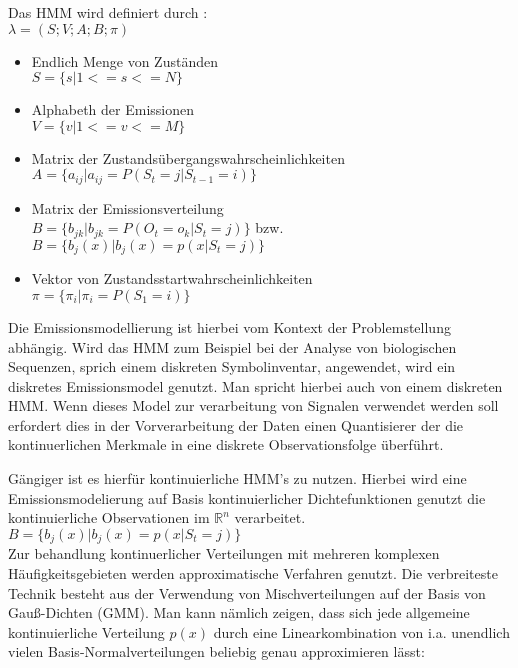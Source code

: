 Das \acl{HMM} wird definiert durch \cite[68]{mmmFink}:\\ 
\( \lambda = (S;V;A;B;\pi)\)
\begin{itemize}
     \item Endlich Menge von Zuständen \\
           \( S = \{ s | 1 <= s <= N \} \)
     \item Alphabeth der Emissionen \\
           \( V = \{ v | 1 <= v <= M \} \)
     \item Matrix der Zustandsübergangswahrscheinlichkeiten \\
           \( A = \{ a_{ij} | a_{ij} = P(S_t = j | S_{t-1} = i) \} \)
     \item Matrix der Emissionsverteilung \\
           \( B = \{ b_{jk} | b_{jk} = P(O_t = o_k | S_t = j) \} \) bzw. \( B =
           \{ b_{j}(x) | b_{j}(x) = p(x|S_t = j) \} \)
     \item Vektor von Zustandsstartwahrscheinlichkeiten \\
           \( \pi = \{ \pi_i | \pi_i = P(S_1 = i) \} \) 
\end{itemize}

Die Emissionsmodellierung ist hierbei vom Kontext der Problemstellung abhängig.
Wird das \acl{HMM} zum Beispiel bei der Analyse von biologischen Sequenzen,
sprich einem diskreten Symbolinventar, angewendet, wird ein diskretes
Emissionsmodel genutzt. Man spricht hierbei auch von einem diskreten \acl{HMM}.
Wenn dieses Model zur verarbeitung von Signalen verwendet werden soll erfordert
dies in der Vorverarbeitung der Daten einen Quantisierer der die
kontinuerlichen Merkmale in eine diskrete Observationsfolge überführt. 

Gängiger ist es hierfür kontinuierliche \acl{HMM}'s zu nutzen. Hierbei wird eine
Emissionsmodelierung auf Basis kontinuierlicher Dichtefunktionen genutzt die
kontinuierliche Observationen im \(\mathbb{R}^n\) verarbeitet.\\ 
\( B =\{ b_{j}(x) | b_{j}(x) = p(x|S_t = j) \} \)\\
Zur behandlung kontinuerlicher Verteilungen mit mehreren komplexen
Häufigkeitsgebieten werden approximatische Verfahren genutzt. Die verbreiteste
Technik besteht aus der Verwendung von Mischverteilungen auf der Basis von
Gauß-Dichten (\acl{GMM}). Man kann nämlich zeigen, dass sich jede allgemeine
kontinuierliche Verteilung \(p(x)\) durch eine Linearkombination von i.a. unendlich vielen
Basis-Normalverteilungen beliebig genau approximieren lässt\cite[69]{mmmFink}:
 
